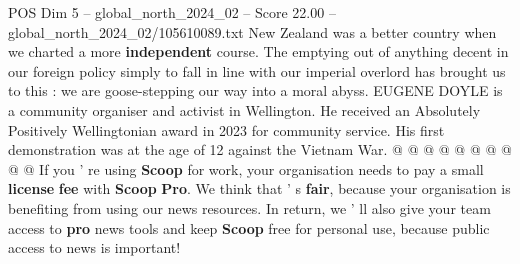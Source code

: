 \begin{textsample}{POS Dim 5 – global\_north\_2024\_02 – Score 22.00 – global\_north\_2024\_02/105610089.txt}
New Zealand was a better country when we charted a more \textbf{independent} course.
The emptying out of anything decent in our foreign policy simply to fall in line with our imperial overlord has brought us to this : we are goose-stepping our way into a moral abyss.
EUGENE DOYLE is a community organiser and activist in Wellington.
He received an Absolutely Positively Wellingtonian award in 2023 for community service.
His first demonstration was at the age of 12 against the Vietnam War. @ @ @ @ @ @ @ @ @ @ If you ' re using \textbf{Scoop} for work, your organisation needs to pay a small \textbf{license} \textbf{fee} with \textbf{Scoop} \textbf{Pro}.
We think that ' s \textbf{fair}, because your organisation is benefiting from using our news resources.
In return, we ' ll also give your team access to \textbf{pro} news tools and keep \textbf{Scoop} free for personal use, because public access to news is important!

\end{textsample}
